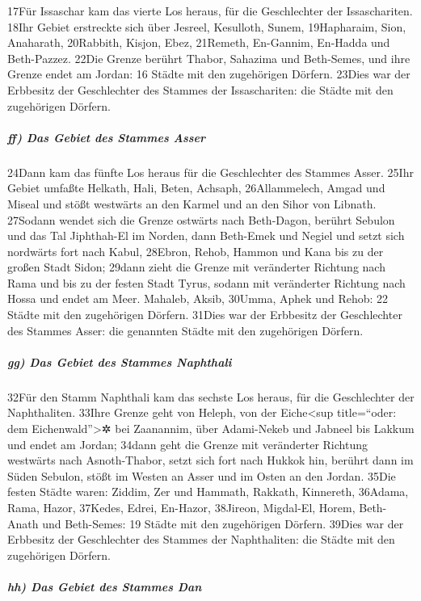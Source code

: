 17Für Issaschar kam das vierte Los heraus, für die Geschlechter der
Issaschariten. 18Ihr Gebiet erstreckte sich über Jesreel, Kesulloth,
Sunem, 19Hapharaim, Sion, Anaharath, 20Rabbith, Kisjon, Ebez, 21Remeth,
En-Gannim, En-Hadda und Beth-Pazzez. 22Die Grenze berührt Thabor,
Sahazima und Beth-Semes, und ihre Grenze endet am Jordan: 16 Städte mit
den zugehörigen Dörfern. 23Dies war der Erbbesitz der Geschlechter des
Stammes der Issaschariten: die Städte mit den zugehörigen Dörfern.

\hypertarget{ff-das-gebiet-des-stammes-asser}{%
\subparagraph{ff) Das Gebiet des Stammes
Asser}\label{ff-das-gebiet-des-stammes-asser}}

24Dann kam das fünfte Los heraus für die Geschlechter des Stammes Asser.
25Ihr Gebiet umfaßte Helkath, Hali, Beten, Achsaph, 26Allammelech, Amgad
und Miseal und stößt westwärts an den Karmel und an den Sihor von
Libnath. 27Sodann wendet sich die Grenze ostwärts nach Beth-Dagon,
berührt Sebulon und das Tal Jiphthah-El im Norden, dann Beth-Emek und
Negiel und setzt sich nordwärts fort nach Kabul, 28Ebron, Rehob, Hammon
und Kana bis zu der großen Stadt Sidon; 29dann zieht die Grenze mit
veränderter Richtung nach Rama und bis zu der festen Stadt Tyrus, sodann
mit veränderter Richtung nach Hossa und endet am Meer. Mahaleb, Aksib,
30Umma, Aphek und Rehob: 22 Städte mit den zugehörigen Dörfern. 31Dies
war der Erbbesitz der Geschlechter des Stammes Asser: die genannten
Städte mit den zugehörigen Dörfern.

\hypertarget{gg-das-gebiet-des-stammes-naphthali}{%
\subparagraph{gg) Das Gebiet des Stammes
Naphthali}\label{gg-das-gebiet-des-stammes-naphthali}}

32Für den Stamm Naphthali kam das sechste Los heraus, für die
Geschlechter der Naphthaliten. 33Ihre Grenze geht von Heleph, von der
Eiche\textless sup title=``oder: dem Eichenwald''\textgreater✲ bei
Zaanannim, über Adami-Nekeb und Jabneel bis Lakkum und endet am Jordan;
34dann geht die Grenze mit veränderter Richtung westwärts nach
Asnoth-Thabor, setzt sich fort nach Hukkok hin, berührt dann im Süden
Sebulon, stößt im Westen an Asser und im Osten an den Jordan. 35Die
festen Städte waren: Ziddim, Zer und Hammath, Rakkath, Kinnereth,
36Adama, Rama, Hazor, 37Kedes, Edrei, En-Hazor, 38Jireon, Migdal-El,
Horem, Beth-Anath und Beth-Semes: 19 Städte mit den zugehörigen Dörfern.
39Dies war der Erbbesitz der Geschlechter des Stammes der Naphthaliten:
die Städte mit den zugehörigen Dörfern.

\hypertarget{hh-das-gebiet-des-stammes-dan}{%
\subparagraph{hh) Das Gebiet des Stammes
Dan}\label{hh-das-gebiet-des-stammes-dan}}

